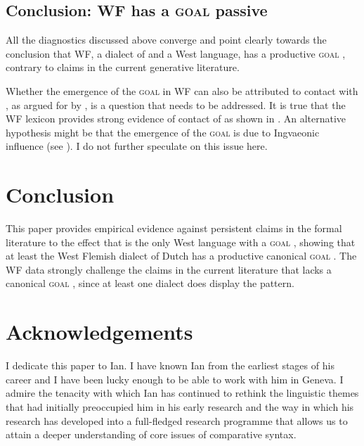 \documentclass[output=paper]{langsci/langscibook}
\begin{document}
\subsection{Conclusion: WF has a \textsc{goal} passive}\label{sec:key:04.2.5}

All the diagnostics discussed above converge and point clearly towards the
conclusion that WF, a dialect of  and a West  language, has
a productive \textsc{goal} , contrary to claims in the current
generative literature.

Whether the emergence of the \textsc{goal}  in \gls{WF} can also be attributed to contact with , as argued for
 by \citet{SteinTripsIngham2016}, is a question that needs to be
addressed. It is true that the \gls{WF} lexicon provides
strong evidence of contact of  as shown in \citet{Haegeman2009}.
An alternative hypothesis might be that the emergence of the \textsc{goal}
 is due to Ingvaeonic influence (see \citealt{Dhaenens2014}). I do
not further speculate on this issue here.

\section{Conclusion}\label{sec:key:04.4} %

This paper provides empirical evidence against persistent claims in the formal
literature to the effect that  is the only West  language
with a \textsc{goal} , showing that at least the West Flemish
dialect of Dutch has a productive canonical \textsc{goal} . The
\gls{WF} data strongly challenge the claims in the current
literature that  lacks a canonical \textsc{goal} ,
since at least one  dialect does display the pattern.

\printchapterglossary{}

\section*{Acknowledgements}

I dedicate this paper to Ian. I have known Ian from the earliest stages of his
career and I have been lucky enough to be able to work with him in Geneva. I
admire the tenacity with which Ian has continued to rethink the linguistic
themes that had initially preoccupied him in his early research and the way in
which his research has developed into a full-fledged research programme that
allows us to attain a deeper understanding of core issues of comparative
syntax.

{\sloppy
\printbibliography[heading=subbibliography,notkeyword=this]
}
\end{document}
